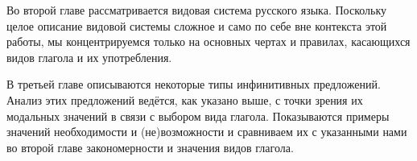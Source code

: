Во второй главе рассматривается видовая система русского языка. Поскольку целое описание видовой системы сложное и само по себе вне контекста этой работы, мы концентрируемся только на основных чертах и правилах, касающихся видов глагола и их употребления.

В третьей главе описываются некоторые типы инфинитивных предложений.  Анализ этих предложений ведётся, как указано выше, с точки зрения их модальных значений в связи с выбором вида глагола. Показываются примеры значений необходимости и (не)возможности и сравниваем их с указанными нами во второй главе закономерности и значения видов глагола.